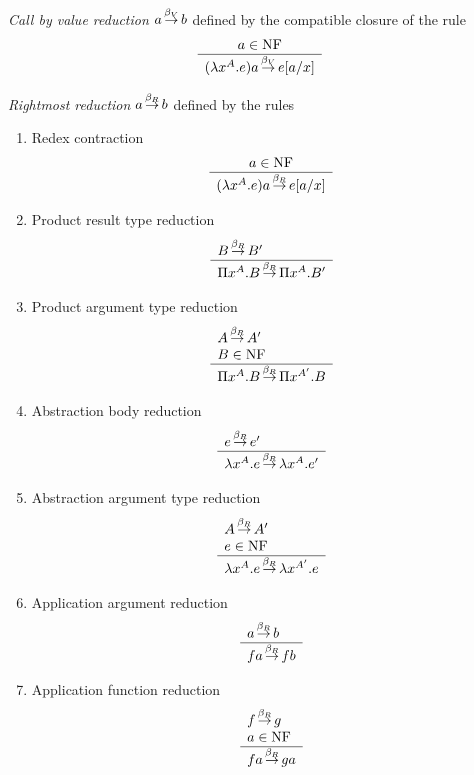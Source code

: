 \begin{definition}
    \emph{Call by value reduction} $a {{\,\stackrel{\beta_V}{\to}\,}} b$ defined by the compatible
    closure of the rule
    $$
    \begin{array}{c} 
        a \in {\text{NF}}
     \\ \hline 
        (\lambda x^A. e) a {{\,\stackrel{\beta_V}{\to}\,}} e[a/x]
    \end{array}
    $$
\end{definition}







\begin{definition}
    \emph{Rightmost reduction} $a {{\,\stackrel{\beta_R}{\to}\,}} b$ defined by the rules
    \begin{enumerate}
        \item Redex contraction
            $$
                \begin{array}{c} 
                    a \in {\text{NF}}
                 \\ \hline 
                    (\lambda x^A. e) a {{\,\stackrel{\beta_R}{\to}\,}} e[a/x]
                \end{array}
            $$

        \item Product result type reduction
            $$
            \begin{array}{l} 
                B {{\,\stackrel{\beta_R}{\to}\,}} B'
             \\ \hline 
                \Pi x^A.B {{\,\stackrel{\beta_R}{\to}\,}} \Pi x^A. B'
            \end{array}
            $$

        \item Product argument type reduction
            $$
            \begin{array}{l} 
                A {{\,\stackrel{\beta_R}{\to}\,}} A'
                \\
                B \in {\text{NF}}
             \\ \hline 
                \Pi x^A.B {{\,\stackrel{\beta_R}{\to}\,}} \Pi x^{A'}. B
            \end{array}
            $$

        \item Abstraction body reduction
            $$
            \begin{array}{l} 
                e {{\,\stackrel{\beta_R}{\to}\,}} e'
             \\ \hline 
                \lambda x^A.e {{\,\stackrel{\beta_R}{\to}\,}} \lambda x^A. e'
            \end{array}
            $$

        \item Abstraction argument type reduction
            $$
            \begin{array}{l} 
                A {{\,\stackrel{\beta_R}{\to}\,}} A'
                \\
                e \in {\text{NF}}
             \\ \hline 
                \lambda x^A.e {{\,\stackrel{\beta_R}{\to}\,}} \lambda x^{A'}. e
            \end{array}
            $$

        \item Application argument reduction
            $$
            \begin{array}{l} 
                a {{\,\stackrel{\beta_R}{\to}\,}} b
             \\ \hline 
                fa {{\,\stackrel{\beta_R}{\to}\,}} fb
            \end{array}
            $$

        \item Application function reduction
            $$
            \begin{array}{l} 
                f {{\,\stackrel{\beta_R}{\to}\,}} g
                \\
                a \in {\text{NF}}
             \\ \hline 
                fa {{\,\stackrel{\beta_R}{\to}\,}} ga
            \end{array}
            $$
    \end{enumerate}
\end{definition}





